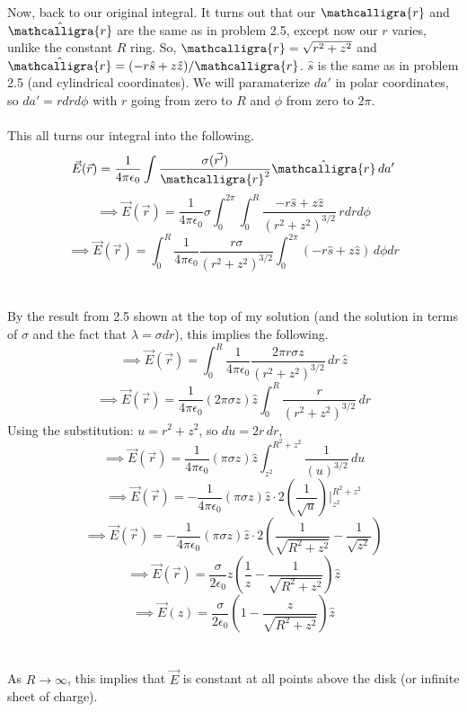 \documentclass[12pt]{article}
\newcommand{\scripty}[1]{\ensuremath{\mathcalligra{#1}}}
\begin{document}
\begin{flushleft}
Now, back to our original integral.
It turns out that our $\scripty{r}$ and $\hat{\scripty{r}}$ are the same as in problem 2.5, except now our $r$ varies, unlike the constant $R$ ring.
So, $\scripty{r}=\sqrt{r^2+z^2}$ and $\hat{\scripty{r}}=(-r\hat{s}+z\hat{z})/\scripty{r}$.
$\hat{s}$ is the same as in problem 2.5 (and cylindrical coordinates).
We will paramaterize $da'$ in polar coordinates, so $da'=rdrd\phi$ with $r$ going from zero to $R$ and $\phi$ from zero to $2\pi$.\\~\\

This all turns our integral into the following.
$$\vec{E}(\vec{r})=\frac{1}{4\pi\epsilon_0}\int\frac{\sigma(\vec{r'})}{\scripty{r}^2}\hat{\scripty{r}}\,da'$$
$$\implies\vec{E}(\vec{r})=\frac{1}{4\pi\epsilon_0}\sigma\int_0^{2\pi}\int_0^R \frac{-r\hat{s}+z\hat{z}}{(r^2+z^2)^{3/2}}\,rdrd\phi$$
$$\implies\vec{E}(\vec{r})=\int_0^R\frac{1}{4\pi\epsilon_0}\frac{r\sigma}{(r^2+z^2)^{3/2}}\int_0^{2\pi} (-r\hat{s}+z\hat{z})\,d\phi dr$$\\~\\

By the result from 2.5 shown at the top of my solution (and the solution in terms of $\sigma$ and the fact that $\lambda=\sigma dr$), this implies the following.
$$\implies\vec{E}(\vec{r})=\int_0^R\frac{1}{4\pi\epsilon_0}\frac{2\pi r\sigma z}{(r^2+z^2)^{3/2}}\,dr\,\hat{z}$$
$$\implies\vec{E}(\vec{r})=\frac{1}{4\pi\epsilon_0}(2\pi\sigma z)\hat{z}\int_0^R\frac{r}{(r^2+z^2)^{3/2}}\,dr$$
Using the substitution: $u=r^2+z^2$, so $du=2r\,dr$,
$$\implies\vec{E}(\vec{r})=\frac{1}{4\pi\epsilon_0}(\pi\sigma z)\hat{z}\int_{z^2}^{R^2+z^2}\frac{1}{(u)^{3/2}}\,du$$
$$\implies\vec{E}(\vec{r})=-\frac{1}{4\pi\epsilon_0}(\pi\sigma z)\hat{z}\cdot2(\frac{1}{\sqrt{u}})\Big|_{z^2}^{R^2+z^2}$$
$$\implies\vec{E}(\vec{r})=-\frac{1}{4\pi\epsilon_0}(\pi\sigma z)\hat{z}\cdot2(\frac{1}{\sqrt{R^2+z^2}}-\frac{1}{\sqrt{z^2}})$$
$$\implies\vec{E}(\vec{r})=\frac{\sigma}{2\epsilon_0}z\left(\frac{1}{z}-\frac{1}{\sqrt{R^2+z^2}}\right)\hat{z}$$
$$\implies\vec{E}(z)=\frac{\sigma}{2\epsilon_0}\left(1-\frac{z}{\sqrt{R^2+z^2}}\right)\hat{z}$$\\~\\

As $R\rightarrow\infty$, this implies that $\vec{E}$ is constant at all points above the disk (or infinite sheet of charge).


\end{flushleft}
\end{document}
